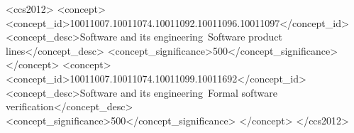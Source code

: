 \documentclass[acmsmall,colorlinks, dvipsnames]{acmart}
\begin{document}
\begin{abstract}

\end{abstract}

\begin{CCSXML}
<ccs2012>
   <concept>
       <concept_id>10011007.10011074.10011092.10011096.10011097</concept_id>
       <concept_desc>Software and its engineering~Software product lines</concept_desc>
       <concept_significance>500</concept_significance>
       </concept>
   <concept>
       <concept_id>10011007.10011074.10011099.10011692</concept_id>
       <concept_desc>Software and its engineering~Formal software verification</concept_desc>
       <concept_significance>500</concept_significance>
       </concept>
 </ccs2012>
\end{CCSXML}
\end{document}
